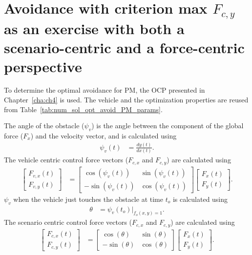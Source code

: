 \chapter[Force and scenario centric]{Avoidance with criterion max $F_{c,y}$ as an exercise with both a scenario-centric and a force-centric perspective}
To determine the optimal avoidance for PM, the OCP presented in Chapter~\ref{cha:ch4} is used. The vehicle and the optimization properties are reused from Table~\ref{tab:num_sol_opt_avoid_PM_params}. 

The angle of the obstacle ($\psi_v$) is the angle between the component of the global force ($F_{x}$) and the velocity vector, and is calculated using 
\begin{align}
    \psi_v(t) &= \frac{dy(t)}{dx(t)}.
\end{align}
The vehicle centric control force vectors ($F_{c,x}$ and $F_{c,y}$) are calculated using
\begin{align}
    \begin{bmatrix}
        F_{v,x}(t) \\
        F_{v,y}(t)
    \end{bmatrix} &=
    \begin{bmatrix}
        \cos\left(\psi_v(t)\right) & \sin\left(\psi_v(t)\right) \\
        -\sin\left(\psi_v(t)\right) & \cos\left(\psi_v(t)\right)
    \end{bmatrix}
    \begin{bmatrix}
        F_{x}(t)\\
        F_{y}(t)
    \end{bmatrix}.
\end{align}
$\psi_v$ when the vehicle just touches the obstacle at time $t_o$ is calculated using 
\begin{align}
    \theta &= \psi_v(t_o)\vert_{f_o(x,y)=1}.
\end{align}
The scenario centric control force vectors ($F_{c,x}$ and $F_{c,y}$) are calculated using
\begin{align}
    \begin{bmatrix}
        F_{c,x}(t) \\
        F_{c,y}(t)
    \end{bmatrix} &=
    \begin{bmatrix}
        \cos\left(\theta\right) & \sin\left(\theta\right) \\
        -\sin\left(\theta\right) & \cos\left(\theta\right)
    \end{bmatrix}
    \begin{bmatrix}
        F_{x}(t)\\
        F_{y}(t)
    \end{bmatrix}.
\end{align}

